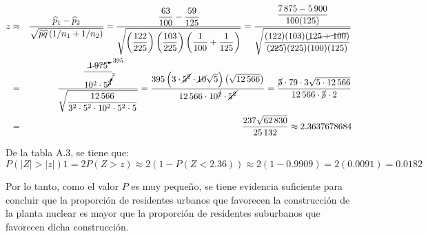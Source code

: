 \begin{solucion}
 \begin{estadistico}
  \begin{eqnarray*}
   z & \approx &
   \frac{\widehat{p}_1 - 
   \widehat{p}_2}{\sqrt{\widehat{p}\widehat{q}\left(1/n_1+1/n_2\right)}}
   = \frac{
   \displaystyle{ \frac{63}{100} - \frac{59}{125}}
   }{
   \displaystyle{ \sqrt{
   \left(\frac{122}{225}\right)\left(\frac{103}{225}\right)
   \left(\frac{1}{100} + \frac{1}{125}\right)
   }}}
   = \frac{
   \displaystyle{ \frac{7\,875 - 5\,900}{100(125)} }
   }{
   \displaystyle{ \sqrt{
   \frac{(122)(103)(\cancel{125 + 100})}{(\cancel{225})(225)(100)(125)}
   }}} \\
   & = & \frac{
   \displaystyle{\frac{\cancelto{395}{1\,975}}{10^2\cdot 5^{\cancelto{2}{3}}}}
   }{
   \displaystyle{\sqrt{\frac{12\,566}{3^2 \cdot 5^2 \cdot 10^2 \cdot 5^2 \cdot 5}}}
   }
   = \frac{
   395\left(3\cdot\cancel{5^2}\cdot\cancel{10}\sqrt{5}\right)
   \left(\sqrt{12\,566}\right)
   }{12\,566\cdot 10^{\cancel{2}}\cdot \cancel{5^{2}}}
   = \frac{
   \cancel{5}\cdot 79 \cdot 3 \sqrt{5\cdot 12\,566}
   }{
   12\,566 \cdot \cancel{5} \cdot 2
   } \\
   & = & \frac{237\sqrt{62\,830}}{25\,132} \approx 2.3637678684
  \end{eqnarray*}
 \end{estadistico}
 
 \begin{valorp}
  De la tabla A.3, se tiene que:
  \begin{equation*}
   P(|Z| > |z|) 1 = 2P(Z > z) \approx 2\left(1 - P(Z < 2.36)\right)
   \approx 2(1-0.9909) = 2(0.0091) = 0.0182
  \end{equation*}
 \end{valorp}
 
 \begin{conclusion}
  Por lo tanto, como el valor $P$ es muy peque\~no,
  se tiene evidencia suficiente para concluir
  que la proporci\'on de residentes urbanos que favorecen
  la construcci\'on de la planta nuclear es mayor que la proporci\'on
  de residentes suburbanos que favorecen dicha construcci\'on.
 \end{conclusion}


\end{solucion}
